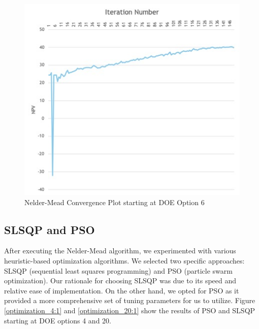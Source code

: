 \documentclass[balance,upint,subscriptcorrection,varvw,mathalfa=cal=boondoxo,spanish,french,vietnamese,russian,greek,pdf-a,colorlinks]{asmeconf}
\begin{document}
\begin{figure}
\centering\includegraphics[width=0.7\linewidth]{images/nelder_option6.jpg}
\caption{Nelder-Mead Convergence Plot starting at DOE Option 6}\label{nelder_option6:1}
\end{figure}
 

\begin{table}[btp]
\caption[Table]{Nelder-Mead Convergence and NPV}\label{nelder_convergence:1}
\end{table}


\subsection{SLSQP and PSO}
After executing the Nelder-Mead algorithm, we experimented with various heuristic-based optimization algorithms. We selected two specific approaches: SLSQP (sequential least squares programming) and PSO (particle swarm optimization). Our rationale for choosing SLSQP was due to its speed and relative ease of implementation. On the other hand, we opted for PSO as it provided a more comprehensive set of tuning parameters for us to utilize. Figure \ref{optimization_4:1} and \ref{optimization_20:1} show the results of PSO and SLSQP starting at DOE options 4 and 20. 
\end{document}
